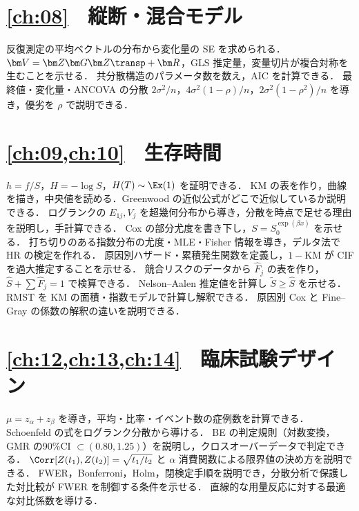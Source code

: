 \section*{\cref{ch:08}　縦断・混合モデル}
\begin{itemize}
\chk 反復測定の平均ベクトルの分布から変化量の SE を求められる．
\chk $\bm V=\bm Z\bm G\bm Z\transp+\bm R$，GLS 推定量，変量切片が複合対称を生むことを示せる．
\chk 共分散構造のパラメータ数を数え，AIC を計算できる．
\chk 最終値・変化量・ANCOVA の分散 $2\sigma^2/n$，$4\sigma^2(1-\rho)/n$，$2\sigma^2(1-\rho^2)/n$ を導き，優劣を $\rho$ で説明できる．
\end{itemize}
\section*{\cref{ch:09,ch:10}　生存時間}
\begin{itemize}
\chk $h=f/S$，$H=-\log S$，$H(T)\sim\Ex(1)$ を証明できる．
\chk KM の表を作り，曲線を描き，中央値を読める．Greenwood の近似公式がどこで近似しているか説明できる．
\chk ログランクの $E_{1j},V_j$ を超幾何分布から導き，分散を時点で足せる理由を説明し，手計算できる．
\chk Cox の部分尤度を書き下し，$S=S_0^{\exp(\beta x)}$ を示せる．
\chk 打ち切りのある指数分布の尤度・MLE・Fisher 情報を導き，デルタ法で HR の検定を作れる．
\chk 原因別ハザード・累積発生関数を定義し，$1-$KM が CIF を過大推定することを示せる．
\chk 競合リスクのデータから $\hat F_j$ の表を作り，$\hat S+\sum\hat F_j=1$ で検算できる．
\chk Nelson--Aalen 推定値を計算し $\tilde S\ge\hat S$ を示せる．RMST を KM の面積・指数モデルで計算し解釈できる．
\chk 原因別 Cox と Fine--Gray の係数の解釈の違いを説明できる．
\end{itemize}
\section*{\cref{ch:12,ch:13,ch:14}　臨床試験デザイン}
\begin{itemize}
\chk $\mu=z_\alpha+z_\beta$ を導き，平均・比率・イベント数の症例数を計算できる．
\chk Schoenfeld の式をログランク分散から導ける．
\chk BE の判定規則（対数変換，GMR の90\%CI $\subset(0.80,1.25)$）を説明し，クロスオーバーデータで判定できる．
\chk $\Corr[Z(t_1),Z(t_2)]=\sqrt{t_1/t_2}$ と $\alpha$ 消費関数による限界値の決め方を説明できる．
\chk FWER，Bonferroni，Holm，閉検定手順を説明でき，分散分析で保護した対比較が FWER を制御する条件を示せる．
\chk 直線的な用量反応に対する最適な対比係数を導ける．
\end{itemize}

